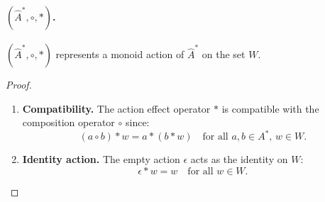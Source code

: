 \paragraph{$(\hat{A}^{\ast}, \circ, \ast)$.}
\begin{proposition}
    $(\hat{A}^{\ast}, \circ, \ast)$ represents a monoid action of $\hat{A}^{\ast}$ on the set $W$.
\end{proposition}
\begin{proof}
    \begin{enumerate}[(1)]
        \item \textbf{Compatibility.}
        The action effect operator $\ast$ is compatible with the composition operator $\circ$ since:
        \begin{equation}
            (a \circ b) \ast w = a \ast (b \ast w) \quad \text{for all } a, b \in A^{\ast}, \, w \in W.
        \end{equation}

        \item \textbf{Identity action.}
        The empty action $\epsilon$ acts as the identity on $W$:
        \begin{equation}
            \epsilon \ast w = w \quad \text{for all } w \in W.
        \end{equation}

    \end{enumerate}
\end{proof}

